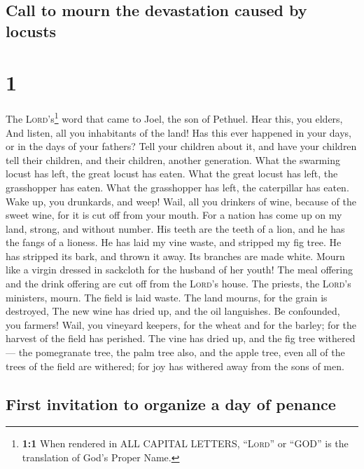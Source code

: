 \hypertarget{call-to-mourn-the-devastation-caused-by-locusts}{%
\subsection{Call to mourn the devastation caused by
locusts}\label{call-to-mourn-the-devastation-caused-by-locusts}}

\hypertarget{section}{%
\section{1}\label{section}}

 The \textsc{Lord}'s\footnote{\textbf{1:1} When rendered
  in ALL CAPITAL LETTERS, ``\textsc{Lord}'' or ``GOD'' is the
  translation of God's Proper Name.} word that came to Joel, the son of
Pethuel.  Hear this, you elders, And listen, all you
inhabitants of the land! Has this ever happened in your days, or in the
days of your fathers?  Tell your children about it, and
have your children tell their children, and their children, another
generation.  What the swarming locust has left, the great
locust has eaten. What the great locust has left, the grasshopper has
eaten. What the grasshopper has left, the caterpillar has eaten.
 Wake up, you drunkards, and weep! Wail, all you drinkers
of wine, because of the sweet wine, for it is cut off from your mouth.
 For a nation has come up on my land, strong, and without
number. His teeth are the teeth of a lion, and he has the fangs of a
lioness.  He has laid my vine waste, and stripped my fig
tree. He has stripped its bark, and thrown it away. Its branches are
made white.  Mourn like a virgin dressed in sackcloth for
the husband of her youth!  The meal offering and the drink
offering are cut off from the \textsc{Lord}'s house. The priests, the
\textsc{Lord}'s ministers, mourn.  The field is laid
waste. The land mourns, for the grain is destroyed, The new wine has
dried up, and the oil languishes.  Be confounded, you
farmers! Wail, you vineyard keepers, for the wheat and for the barley;
for the harvest of the field has perished.  The vine has
dried up, and the fig tree withered--- the pomegranate tree, the palm
tree also, and the apple tree, even all of the trees of the field are
withered; for joy has withered away from the sons of men.

\hypertarget{first-invitation-to-organize-a-day-of-penance}{%
\subsection{First invitation to organize a day of
penance}\label{first-invitation-to-organize-a-day-of-penance}}

